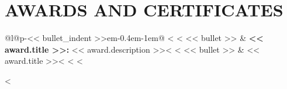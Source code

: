 \documentclass[fontsize=<< font_size >>pt, a4paper, DIV=12]{scrartcl}
\begin{document}
\section*{AWARDS AND CERTIFICATES}
\begin{tabular}{@{\hspace{<< bullet_indent >>em}}l@{\hspace{0.4em}}p{}@{}}
<%
<%
    \textcolor{sectionblue}{<< bullet >>} & \textbf{<< award.title >>:} << award.description >><%
<%
    \textcolor{sectionblue}{<< bullet >>} & << award.title >><%
<%
<%
\end{tabular}
<%
\end{document}

